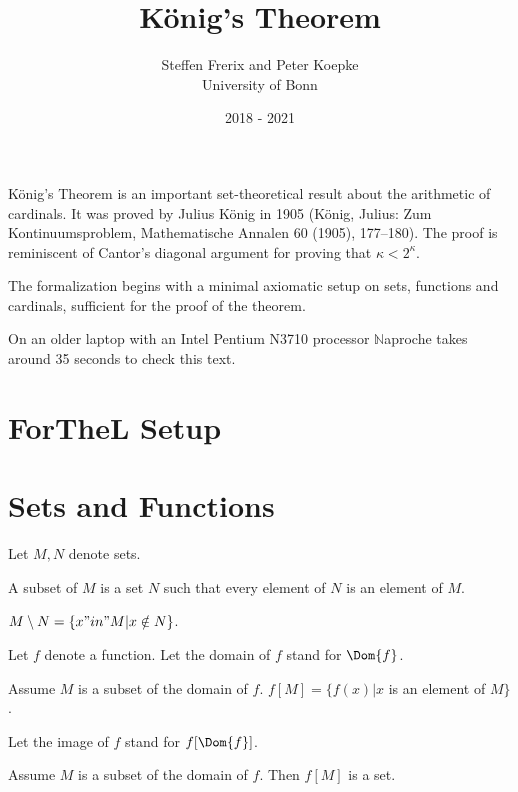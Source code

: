 \documentclass{article}
\title{König's Theorem}
\author{Steffen Frerix and Peter Koepke\\
University of Bonn}
\date{2018 - 2021}
\newcommand{\Naproche}{$\mathbb{N}$aproche}
\begin{document}
  \maketitle

König's Theorem is an important set-theoretical result about the
arithmetic of cardinals. It was proved by Julius König in 1905
(König, Julius: Zum Kontinuumsproblem, Mathematische Annalen 60 (1905), 177–180).
The proof is reminiscent of Cantor's diagonal argument for
proving that $\kappa < 2^\kappa$.

The formalization begins with a minimal axiomatic setup on sets, functions
and cardinals, sufficient for the proof of the theorem.

On an older laptop
with an Intel Pentium N3710 processor \Naproche{} takes
around 35 seconds to check this text.

\section{ForTheL Setup}

\begin{forthel}
\end{forthel}


\section{Sets and Functions}

\begin{forthel}
    Let $M,N$ denote sets.

    \begin{definition}
     A subset of $M$ is a set $N$ such that every element
     of $N$ is an element of $M$.
    \end{definition}

    \begin{definition}
      $M \setminus N = \{x "in" M | x \notin N \}$.
    \end{definition}

    Let $f$ denote a function.
    Let the domain of $f$ stand for $\Dom{f}$.

    \begin{definition}
      Assume $M$ is a subset of the domain of $f$.
      $f[M] = \{f(x) | x$ is an element of $M\}$.
    \end{definition}

    Let the image of $f$ stand for $f[\Dom{f}]$.

    \begin{axiom}
      Assume $M$ is a subset of the domain of $f$.
      Then $f[M]$ is a set.
    \end{axiom}
\end{forthel}
\end{document}
